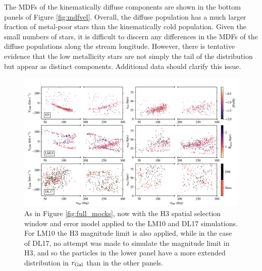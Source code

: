 \documentclass[twocolumn,tighten,twocolappendix]{aastex63}
\begin{document}
\begin{CJK*}{UTF8}{gbsn}
The MDFs of the kinematically diffuse components are shown in the bottom panels of Figure \ref{fig:mdfvel}.  Overall, the diffuse population has a much larger fraction of metal-poor stars than the kinematically cold population.  Given the small numbers of stars, it is difficult to discern any differences in the MDFs of the diffuse populations along the stream longitude.  However, there is tentative evidence that the low metallicity stars are not simply the tail of the distribution but appear as distinct components.  Additional data should clarify this issue.


\begin{figure}[!t]
\includegraphics[width=\textwidth]{frankenplot.pdf}
\caption{As in Figure \ref{fig:full_mocks}, now with the H3 spatial selection window and error model applied to the LM10 and DL17 simulations.  For LM10 the H3 magnitude limit is also applied, while in the case of DL17, no attempt was made to simulate the magnitude limit in H3, and so the particles in the lower panel have a more extended distribution in $r_{\rm Gal}$ than in the other panels.
\label{fig:franken}}
\end{figure}



\end{CJK*}
\end{document}
